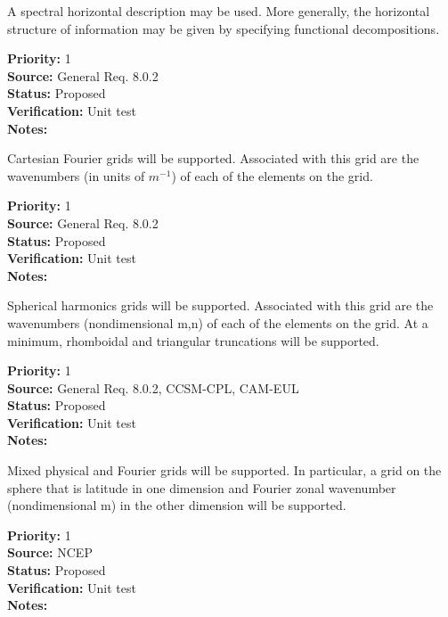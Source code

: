 A spectral horizontal description may be used.  More generally, the horizontal
structure of information may be given by specifying functional decompositions.
\begin{reqlist}
{\bf Priority:} 1 \\
{\bf Source:} General Req. 8.0.2  \\
{\bf Status:} Proposed \\
{\bf Verification:} Unit test\\
{\bf Notes:}
\end{reqlist}

Cartesian Fourier grids will be supported.  Associated with this grid are the
wavenumbers (in units of $m^{-1}$) of each of the elements on the grid.
\begin{reqlist}
{\bf Priority:} 1 \\
{\bf Source:} General Req. 8.0.2 \\
{\bf Status:} Proposed \\
{\bf Verification:} Unit test\\
{\bf Notes:}
\end{reqlist}

Spherical harmonics grids will be supported.  Associated with this grid are the
wavenumbers (nondimensional m,n) of each of the elements on the grid.  At a
minimum, rhomboidal and triangular truncations will be supported.
\begin{reqlist}
{\bf Priority:} 1 \\
{\bf Source:} General Req. 8.0.2, CCSM-CPL, CAM-EUL \\
{\bf Status:} Proposed \\
{\bf Verification:} Unit test\\
{\bf Notes:}
\end{reqlist}

Mixed physical and Fourier grids will be supported. In particular, a grid on the
sphere that is latitude in one dimension and Fourier zonal wavenumber
(nondimensional m) in the other dimension will be supported.
\begin{reqlist}
{\bf Priority:} 1 \\
{\bf Source:} NCEP \\
{\bf Status:} Proposed \\
{\bf Verification:} Unit test\\
{\bf Notes:}
\end{reqlist}

